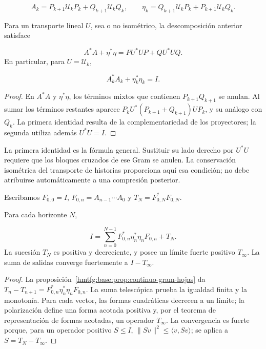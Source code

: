 \[
A_k=P_{k+1}\mathcal U_kP_k+Q_{k+1}\mathcal U_kQ_k,
\qquad
\eta_k=Q_{k+1}\mathcal U_kP_k+P_{k+1}\mathcal U_kQ_k.
\]
\begin{proposition}
\label{hmtfg:base:prop:continuo-gram-hojas}
Para un transporte lineal \(U\), sea o no isométrico, la descomposición anterior satisface

\[
A^*A+\eta^*\eta=PU^*UP+QU^*UQ.
\]
En particular, para \(U=\mathcal U_k\),

\[
A_k^*A_k+\eta_k^*\eta_k=I.
\]
\end{proposition}
\begin{proof}
En \(A^*A\) y \(\eta^*\eta\), los términos mixtos que contienen \(P_{k+1}Q_{k+1}\) se anulan. Al sumar los términos restantes aparece \(P_kU^*(P_{k+1}+Q_{k+1})UP_k\), y su análogo con \(Q_k\). La primera identidad resulta de la complementariedad de los proyectores; la segunda utiliza además \(U^*U=I\).
\end{proof}

La primera identidad es la fórmula general. Sustituir su lado derecho por \(U^*U\) requiere que los bloques cruzados de ese Gram se anulen. La conservación isométrica del transporte de historias proporciona aquí esa condición; no debe atribuirse automáticamente a una compresión posterior.

Escribamos \(F_{0,0}=I\), \(F_{0,n}=A_{n-1}\cdots A_0\) y \(T_N=F_{0,N}^*F_{0,N}\).

\begin{theorem}
\label{hmtfg:base:thm:continuo-descomposicion-terminal}
Para cada horizonte \(N\),

\[
I=\sum_{n=0}^{N-1}
F_{0,n}^*\eta_n^*\eta_nF_{0,n}+T_N.
\]
La sucesión \(T_N\) es positiva y decreciente, y posee un límite fuerte positivo \(T_\infty\). La suma de salidas converge fuertemente a \(I-T_\infty\).
\end{theorem}
\begin{proof}
La proposición~\ref{hmtfg:base:prop:continuo-gram-hojas} da \(T_n-T_{n+1}=F_{0,n}^*\eta_n^*\eta_nF_{0,n}\). La suma telescópica prueba la igualdad finita y la monotonía. Para cada vector, las formas cuadráticas decrecen a un límite; la polarización define una forma acotada positiva y, por el teorema de representación de formas acotadas, un operador \(T_\infty\). La convergencia es fuerte porque, para un operador positivo \(S\leq I\), \(\|Sv\|^2\leq\langle v,Sv\rangle\); se aplica a \(S=T_N-T_\infty\).
\end{proof}


